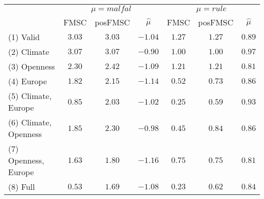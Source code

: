 \begin{tabular}{lcccccc}
\hline\hline
 & \multicolumn{3}{c}{$\mu = malfal$}& \multicolumn{3}{c}{$\mu = rule$}\\ 
 & FMSC & posFMSC & $\widehat{\mu}$ & FMSC & posFMSC & $\widehat{\mu}$ \\ 
 \hline
 (1) Valid & $ 3.03$ & $ 3.03$ & $-1.04$ & $1.27$ & $1.27$ & $0.89$\\ 
(2) Climate & $ 3.07$ & $ 3.07$ & $-0.90$ & $1.00$ & $1.00$ & $0.97$\\ 
(3) Openness & $ 2.30$ & $ 2.42$ & $-1.09$ & $1.21$ & $1.21$ & $0.81$\\ 
(4) Europe & $ 1.82$ & $ 2.15$ & $-1.14$ & $0.52$ & $0.73$ & $0.86$\\ 
(5) Climate, Europe & $ 0.85$ & $ 2.03$ & $-1.02$ & $0.25$ & $0.59$ & $0.93$\\ 
(6) Climate, Openness & $ 1.85$ & $ 2.30$ & $-0.98$ & $0.45$ & $0.84$ & $0.86$\\ 
(7) Openness, Europe & $ 1.63$ & $ 1.80$ & $-1.16$ & $0.75$ & $0.75$ & $0.81$\\ 
(8) Full & $ 0.53$ & $ 1.69$ & $-1.08$ & $0.23$ & $0.62$ & $0.84$ \\ 
 \hline
 \end{tabular}